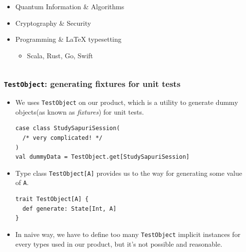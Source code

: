 \begin{frame}
\begin{columns}
\begin{column}{0.7\textwidth}
\begin{itemize}
        \item Quantum Information \& Algorithms

        \item Cryptography \& Security
        
        \item Programming \& {\LaTeX} typesetting
        \begin{itemize}
          \item Scala, Rust, Go, Swift
        \end{itemize}
      \end{itemize}
    \end{column}
  \end{columns}
\end{frame}

\begin{frame}[fragile]
  \frametitle{\lstinline|TestObject|: generating fixtures for unit tests}

  \begin{itemize}
    \item We uses \lstinline|TestObject| on our product,
    which is a utility to generate dummy objects(as known as \emph{fixtures}) for unit tests.
\begin{lstlisting}[style=scala]
case class StudySapuriSession(
  /* very complicated! */
)
val dummyData = TestObject.get[StudySapuriSession]
\end{lstlisting}

    \item Type class \lstinline|TestObject[A]| provides us to the way for generating some value of \lstinline|A|.
\begin{lstlisting}[style=scala]
trait TestObject[A] {
  def generate: State[Int, A]
}
\end{lstlisting}

    \item In naive way, we have to define too many \lstinline|TestObject| implicit instances for
    every types used in our product, but it's not possible and reasonable.
  \end{itemize}
\end{frame}

